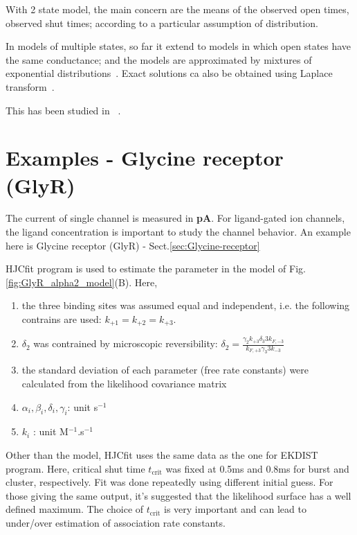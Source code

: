 \begin{framed}
  With 2 state model, the main concern are the means of the observed
  open times, observed shut times; according to a particular assumption
  of distribution.

  In models of multiple states, so far it extend to models in which open
  states have the same conductance; and the models are approximated by
  mixtures of exponential
  distributions~\citep{schurholz1993ado,blatz1986csc}. Exact solutions
  ca also be obtained using Laplace transform~\citep{ball1989icg}.
\end{framed}


This has been studied in ~\citep{colquhoun1987ncs}.

\section{Examples - Glycine receptor (GlyR)}
\label{sec:GlyR_example}

The current of single channel is measured in {\bf pA}. For ligand-gated ion
channels, the ligand concentration is important to study the channel behavior.
An example here is Glycine receptor (GlyR) - Sect.\ref{sec:Glycine-receptor}

HJCfit program is used to estimate the parameter in the model of
Fig.\ref{fig:GlyR_alpha2_model}(B). Here,
\begin{enumerate}
  \item  the three binding sites was assumed
equal and independent, i.e. the following contrains are used:
$k_{+1}=k_{+2}=k_{+3}$.
  \item $\delta_2$ was contrained by microscopic reversibility: $\delta_2 =
  \frac{\gamma_2 k_{+3} \delta_3 3k_{F,-3}}{k_{F,+3}\gamma_3 3k_{-3}}$
  \item the standard deviation of each parameter (free rate constants) were
  calculated from the likelihood covariance matrix \citep{colquhoun2003}
  \item $\alpha_i, \beta_i, \delta_i, \gamma_i$: unit s$^{-1}$
  \item $k_i$ : unit M$^{-1}$.s$^{-1}$
\end{enumerate}

Other than the model, HJCfit uses the same data as the one for EKDIST program.
Here, critical shut time $t_\text{crit}$ was fixed at 0.5ms and 0.8ms for burst
and cluster, respectively. Fit was done repeatedly using different initial
guess. For those giving the same output, it's suggested that the likelihood
surface has a well defined maximum. The choice of $t_\text{crit}$ is very
important and can lead to under/over estimation of association rate constants.

